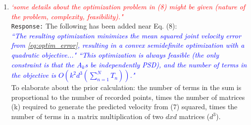 \documentclass{article}
\begin{document}
\begin{enumerate}
\item \textcolor{red}{\textit{`some details about the optimization problem in (8) might be given
(nature of the problem, complexity, feasibility)."}}\\
\texttt{Response:} The following has been added near Eq. (8):\\
\textcolor{blue}{\small \textit{``The resulting optimization minimizes the mean squared joint velocity error from \eqref{eq:optim_error}, resulting in a convex semidefinite optimization with a quadratic objective..." ``This optimization is always feasible (the only constraint is that the $A_k$s be independently PSD), and the number of terms in the objective is $O\left(k^2d^3\left( \sum_{n=1}^N T_n\right)\right)$."}}\\
To elaborate about the prior calculation: the number of terms in the sum is proportional to the number of recorded points, times the number of matrices (k) required to generate the predicted velocity from (7) squared, times the number of terms in a matrix multiplication of two $d x d$ matrices ($d^3$).\\

\end{enumerate}





\end{document}
